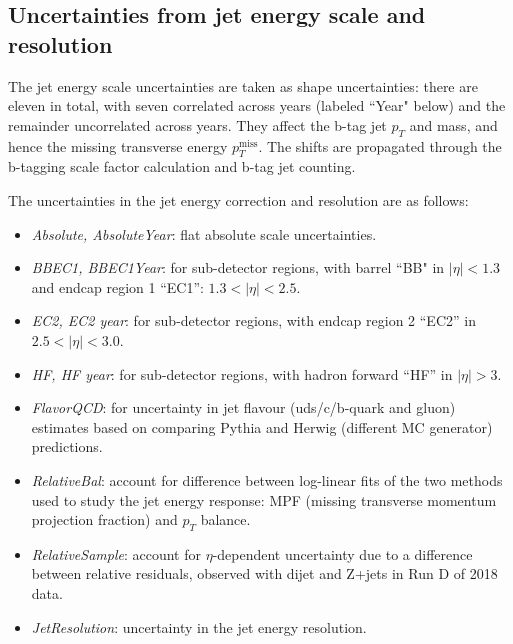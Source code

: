 \subsection{Uncertainties from jet energy scale and resolution}
\label{subsec:JEC_sys}
The jet energy scale uncertainties are taken as shape uncertainties: there are eleven in total, with seven correlated across years (labeled ``Year" below) and the remainder uncorrelated across years. They affect the b-tag jet $p_{T}$ and mass, and hence the missing transverse energy $p_{T}^{\text{miss}}$. The shifts are propagated through the b-tagging scale factor calculation and b-tag jet counting. 

The uncertainties in the jet energy correction and resolution \cite{CMS-JME-13-004} \cite{twiki_JetEnergyScale_Uncertainty_Sources_JERC} are as follows:
    \begin{itemize}
        \item \textit{Absolute, AbsoluteYear}: flat absolute scale uncertainties.
        \item \textit{BBEC1, BBEC1Year}: for sub-detector regions, with barrel ``BB" in $|\eta| < 1.3$ and endcap region 1 ``EC1'': $1.3 < |\eta| < 2.5$.
        \item \textit{EC2, EC2 year}: for sub-detector regions, with endcap region 2 ``EC2'' in $2.5 < |\eta| < 3.0$.
        \item \textit{HF, HF year}: for sub-detector regions, with hadron forward ``HF'' in $|\eta| > 3$.
        \item \textit{FlavorQCD}: for uncertainty in jet flavour (uds/c/b-quark and gluon) estimates based on comparing Pythia and Herwig (different MC generator) predictions. 
        \item \textit{RelativeBal}: account for difference between log-linear fits of the two methods used to study the jet energy response: MPF (missing transverse momentum projection fraction) and $p_{T}$ balance.
        \item \textit{RelativeSample}: account for $\eta$-dependent uncertainty due to a difference between relative residuals, observed with dijet and Z+jets in Run D of 2018 data.
        \item \textit{JetResolution}: uncertainty in the jet energy resolution.
    \end{itemize}

